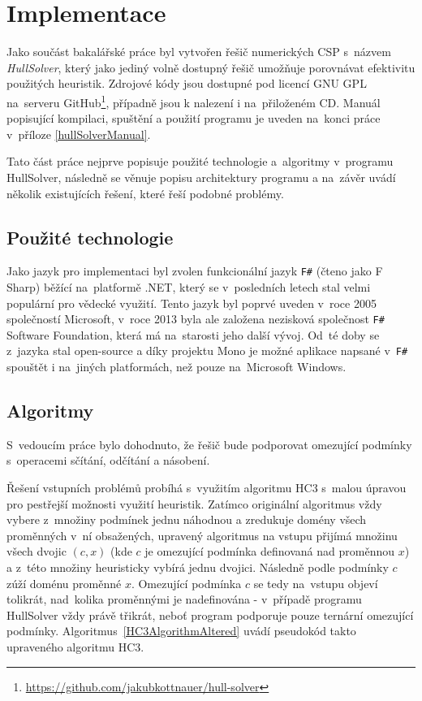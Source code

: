 



\chapter{Implementace}
Jako součást bakalářské práce byl vytvořen řešič numerických CSP s~názvem \emph{HullSolver}, který jako jediný volně dostupný řešič umožňuje porovnávat efektivitu použitých heuristik. Zdrojové kódy jsou dostupné pod licencí GNU GPL na~serveru GitHub\footnote{\url{https://github.com/jakubkottnauer/hull-solver}}, případně jsou k nalezení i na~přiloženém CD. Manuál popisující kompilaci, spuštění a použití programu je uveden na~konci práce v~příloze \ref{hullSolverManual}.

Tato část práce nejprve popisuje použité technologie a~algoritmy v~programu HullSolver, následně se věnuje popisu architektury programu a na~závěr uvádí několik existujících řešení, které řeší podobné problémy.


\section{Použité technologie}
Jako jazyk pro implementaci byl zvolen funkcionální jazyk \texttt{F\#} (čteno jako F Sharp) běžící na~platformě .NET, který se v~posledních letech stal velmi populární pro vědecké využití. Tento jazyk byl poprvé uveden v~roce 2005 společností Microsoft, v~roce 2013 byla ale založena nezisková společnost \texttt{F\#} Software Foundation, která má na~starosti jeho další vývoj. Od~té doby se z~jazyka stal open-source a díky projektu Mono je možné aplikace napsané v~\texttt{F\#} spouštět i na~jiných platformách, než pouze na~Microsoft Windows.

\section{Algoritmy}

S~vedoucím práce bylo dohodnuto, že řešič bude podporovat omezující podmínky s~operacemi sčítání, odčítání a násobení.

Řešení vstupních problémů probíhá s~využitím algoritmu HC3 s~malou úpravou pro pestřejší možnosti využití heuristik. Zatímco originální algoritmus vždy vybere z~množiny podmínek jednu náhodnou a zredukuje domény všech proměnných v~ní obsažených, upravený algoritmus na vstupu přijímá množinu všech dvojic $(c, x)$ (kde $c$ je omezující podmínka definovaná nad proměnnou $x$) a z~této množiny heuristicky vybírá jednu dvojici. Následně podle podmínky $c$ zúží doménu proměnné $x$. Omezující podmínka $c$ se tedy na~vstupu objeví tolikrát, nad~kolika proměnnými je nadefinována - v~případě programu HullSolver vždy právě třikrát, neboť program podporuje pouze ternární omezující podmínky. Algoritmus~\ref{HC3AlgorithmAltered} uvádí pseudokód takto upraveného algoritmu HC3.

